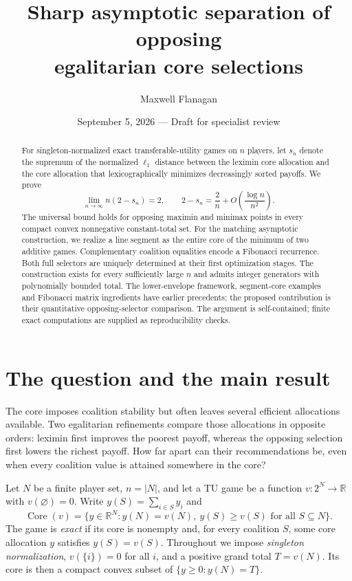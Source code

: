 \documentclass[11pt]{article}
\title{Sharp asymptotic separation of opposing\\egalitarian core selections}
\author{Maxwell Flanagan}
\date{September 5, 2026 --- Draft for specialist review}
\newcommand{\Core}{\operatorname{Core}}
\begin{document}
\maketitle

\begin{abstract}
For singleton-normalized exact transferable-utility games on $n$ players,
let $s_n$ denote the supremum of the normalized $\ell_1$ distance between
the leximin core allocation and the core allocation that lexicographically
minimizes decreasingly sorted payoffs. We prove
\[
 \lim_{n\to\infty}n(2-s_n)=2,
 \qquad 2-s_n=\frac2n+O\!\left(\frac{\log n}{n^2}\right).
\]
The universal bound holds for opposing maximin and minimax points in every
compact convex nonnegative constant-total set. For the matching asymptotic
construction, we realize a line segment as the entire core of the minimum
of two additive games. Complementary coalition equalities encode a
Fibonacci recurrence. Both full selectors are uniquely determined at their
first optimization stages. The construction exists for every sufficiently
large $n$ and admits integer generators with polynomially bounded total.
The lower-envelope framework, segment-core examples and Fibonacci matrix
ingredients have earlier precedents; the proposed contribution is their
quantitative opposing-selector comparison.
The argument is self-contained; finite exact computations are supplied as
reproducibility checks.
\end{abstract}

\section{The question and the main result}

The core imposes coalition stability but often leaves several efficient
allocations available. Two egalitarian refinements compare those allocations
in opposite orders: leximin first improves the poorest payoff, whereas the
opposing selection first lowers the richest payoff. How far apart can their
recommendations be, even when every coalition value is attained somewhere
in the core?

Let $N$ be a finite player set, $n=|N|$, and let a TU game be a function
$v:2^N\to\mathbb R$ with $v(\varnothing)=0$. Write
$y(S)=\sum_{i\in S}y_i$ and
\[
 \Core(v)=\{y\in\mathbb R^N:y(N)=v(N),\ y(S)\ge v(S)
                                      \text{ for all }S\subseteq N\}.
\]
The game is \emph{exact} if its core is nonempty and, for every coalition
$S$, some core allocation $y$ satisfies $y(S)=v(S)$. Throughout we impose
\emph{singleton normalization}, $v(\{i\})=0$ for all $i$, and a positive
grand total $T=v(N)$. Its core is then a compact convex subset of
$\{y\ge0:y(N)=T\}$.
\end{document}
